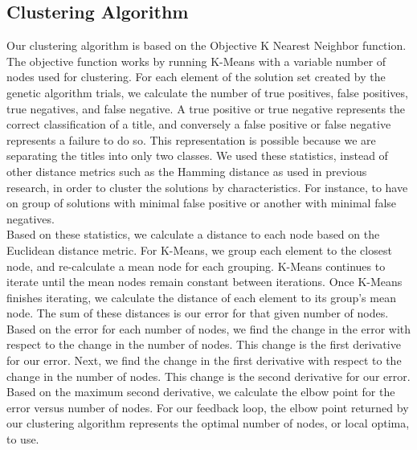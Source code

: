 \documentclass{sig-alternate}
\begin{document}
\subsection{Clustering Algorithm}
Our clustering algorithm is based on the Objective K Nearest Neighbor function. The objective function works by running K-Means with a variable number of nodes used for clustering. For each element of the solution set created by the genetic algorithm trials, we calculate the number of true positives, false positives, true negatives, and false negative. A true positive or true negative represents the correct classification of a title, and conversely a false positive or false negative represents a failure to do so. This representation is possible because we are separating the titles into only two classes. We used these statistics, instead of other distance metrics such as the Hamming distance as used in previous research\cite{ole:feedback}, in order to cluster the solutions by characteristics. For instance, to have on group of solutions with minimal false positive or another with minimal false negatives.\\
\indent Based on these statistics, we calculate a distance to each node based on the Euclidean distance metric. For K-Means, we group each element to the closest node, and re-calculate a mean node for each grouping. K-Means continues to iterate until the mean nodes remain constant between iterations. Once K-Means finishes iterating, we calculate the distance of each element to its group's mean node. The sum of these distances is our error for that given number of nodes.\\
\indent Based on the error for each number of nodes, we find the change in the error with respect to the change in the number of nodes. This change is the first derivative for our error. Next, we find the change in the first derivative with respect to the change in the number of nodes. This change is the second derivative for our error. Based on the maximum second derivative, we calculate the elbow point for the error versus number of nodes. For our feedback loop, the elbow point returned by our clustering algorithm represents the optimal number of nodes, or local optima, to use.
\end{document}
